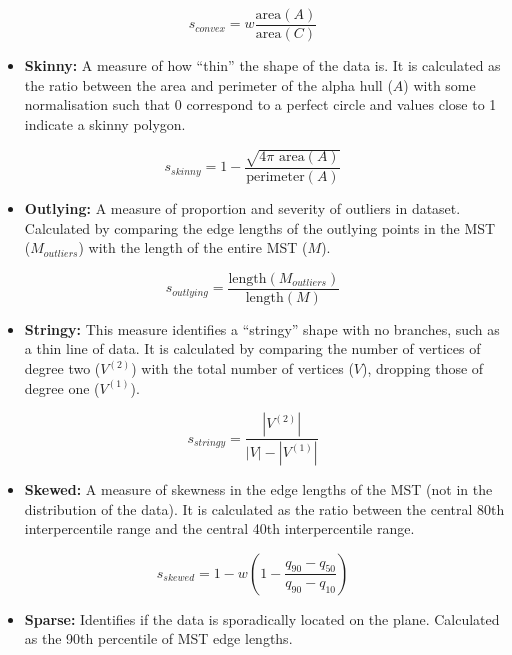 \[s_{convex}=w\frac{\mbox{area}(A)}{\mbox{area}(C)}\]

\begin{itemize}
\tightlist
\item
  \textbf{Skinny:} A measure of how ``thin'' the shape of the data is.
  It is calculated as the ratio between the area and perimeter of the
  alpha hull (\(A\)) with some normalisation such that 0 correspond to a
  perfect circle and values close to 1 indicate a skinny polygon.
\end{itemize}

\[s_{skinny}= 1-\frac{\sqrt{4\pi \mbox{ area}(A)}}{\mbox{perimeter}(A)}\]

\begin{itemize}
\tightlist
\item
  \textbf{Outlying:} A measure of proportion and severity of outliers in
  dataset. Calculated by comparing the edge lengths of the outlying
  points in the MST (\(M_{outliers}\)) with the length of the entire MST
  (\(M\)).
\end{itemize}

\[s_{outlying}=\frac{\mbox{length}(M_{outliers})}{\mbox{length}(M)}\]

\begin{itemize}
\tightlist
\item
  \textbf{Stringy:} This measure identifies a ``stringy'' shape with no
  branches, such as a thin line of data. It is calculated by comparing
  the number of vertices of degree two (\(V^{(2)}\)) with the total
  number of vertices (\(V\)), dropping those of degree one
  (\(V^{(1)}\)).
\end{itemize}

\[s_{stringy} = \frac{|V^{(2)}|}{|V|-|V^{(1)}|}\]

\begin{itemize}
\tightlist
\item
  \textbf{Skewed:} A measure of skewness in the edge lengths of the MST
  (not in the distribution of the data). It is calculated as the ratio
  between the central 80th interpercentile range and the central 40th
  interpercentile range.
\end{itemize}

\[s_{skewed} = 1-w\left(1-\frac{q_{90}-{q_{50}}}{q_{90}-q_{10}}\right)\]

\begin{itemize}
\tightlist
\item
  \textbf{Sparse:} Identifies if the data is sporadically located on the
  plane. Calculated as the 90th percentile of MST edge lengths.
\end{itemize}

